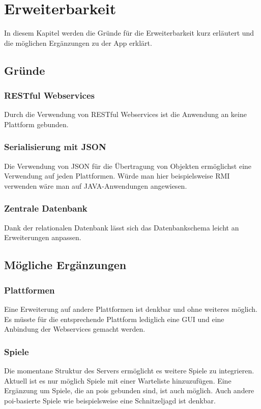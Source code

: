 \chapter{Erweiterbarkeit}
In diesem Kapitel werden die Gründe für die Erweiterbarkeit kurz erläutert und die möglichen Ergänzungen zu der App erklärt.


\section{Gründe}
\subsection{RESTful Webservices}
Durch die Verwendung von RESTful Webservices ist die Anwendung an keine Plattform gebunden.

\subsection{Serialisierung mit JSON}
Die Verwendung von JSON für die Übertragung von Objekten ermöglichst eine Verwendung auf jeden Plattformen. Würde man hier beispielsweise RMI verwenden wäre man auf JAVA-Anwendungen angewiesen.


\subsection{Zentrale Datenbank}


Dank der relationalen Datenbank lässt sich das Datenbankschema leicht an Erweiterungen anpassen. 
\section{Mögliche Ergänzungen}
\subsection{Plattformen}
Eine Erweiterung auf andere Plattformen ist denkbar und ohne weiteres möglich. Es müsste für die entsprechende Plattform lediglich eine GUI und eine Anbindung der Webservices gemacht werden.

\subsection{Spiele}
Die momentane Struktur des Servers ermöglicht es weitere Spiele zu integrieren. Aktuell ist es nur möglich Spiele mit einer Warteliste hinzuzufügen. Eine Ergänzung um Spiele, die an \glspl{poi} gebunden sind, ist auch möglich. Auch andere \gls{poi}-basierte Spiele wie beispielsweise eine Schnitzeljagd ist denkbar.

